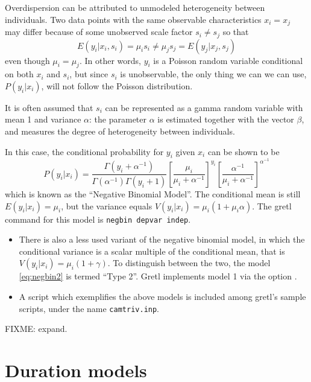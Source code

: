 Overdispersion can be attributed to unmodeled heterogeneity between
individuals. Two data points with the same observable characteristics
$x_i = x_j$ may differ because of some unobserved scale factor $s_i
\ne s_j$ so that
\[
   E(y_i | x_i, s_i) = \mu_i s_i \ne \mu_j s_j = E(y_j | x_j, s_j)
\]
even though $\mu_i = \mu_j$. In other words, $y_i$ is a Poisson random
variable conditional on both $x_i$ and $s_i$, but since $s_i$ is
unobservable, the only thing we can we can use, $P(y_i | x_i)$, will
not follow the Poisson distribution.

It is often assumed that $s_i$ can be represented as a gamma random
variable with mean 1 and variance $\alpha$: the parameter $\alpha$ is
estimated together with the vector $\beta$, and measures the degree of
heterogeneity between individuals.

In this case, the conditional probability for $y_i$ given
$x_i$ can be shown to be
  \begin{equation}
    \label{eq:negbin2}
  P(y_i | x_i) = 
  \frac{\Gamma(y_i + \alpha^{-1})}{\Gamma(\alpha^{-1})\Gamma(y_i + 1)}
  \left[ \frac{\mu_i} {\mu_i + \alpha^{-1} }\right]^{y_i}
  \left[ \frac{\alpha^{-1}} {\mu_i + \alpha^{-1} }\right]^{\alpha^{-1}}
\end{equation}
which is known as the ``Negative Binomial Model''. The conditional
mean is still $E(y_i | x_i) = \mu_i$, but the variance equals $V(y_i |
x_i) = \mu_i \left( 1 + \mu_i \alpha \right)$. The gretl command
for this model is \texttt{negbin depvar indep}.

\begin{itemize}
\item There is also a less used variant of the negative binomial
  model, in which the conditional variance is a scalar multiple of the
  conditional mean, that is $V(y_i | x_i) = \mu_i \left( 1 + \gamma
  \right)$. To distinguish between the two, the model
  \eqref{eq:negbin2} is termed ``Type 2''.  Gretl implements
  model 1 via the option .
\item A script which exemplifies the above models is included among
  gretl's sample scripts, under the name \texttt{camtriv.inp}.
\end{itemize}

FIXME: expand.

\section{Duration models}
\label{sec:duration}

